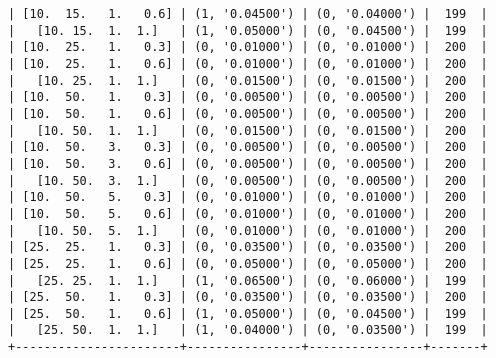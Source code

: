\documentclass{article}
\begin{document}
\begin{verbatim}
| [10.  15.   1.   0.6] | (1, '0.04500') | (0, '0.04000') |  199  |
|   [10. 15.  1.  1.]   | (1, '0.05000') | (0, '0.04500') |  199  |
| [10.  25.   1.   0.3] | (0, '0.01000') | (0, '0.01000') |  200  |
| [10.  25.   1.   0.6] | (0, '0.01000') | (0, '0.01000') |  200  |
|   [10. 25.  1.  1.]   | (0, '0.01500') | (0, '0.01500') |  200  |
| [10.  50.   1.   0.3] | (0, '0.00500') | (0, '0.00500') |  200  |
| [10.  50.   1.   0.6] | (0, '0.00500') | (0, '0.00500') |  200  |
|   [10. 50.  1.  1.]   | (0, '0.01500') | (0, '0.01500') |  200  |
| [10.  50.   3.   0.3] | (0, '0.00500') | (0, '0.00500') |  200  |
| [10.  50.   3.   0.6] | (0, '0.00500') | (0, '0.00500') |  200  |
|   [10. 50.  3.  1.]   | (0, '0.00500') | (0, '0.00500') |  200  |
| [10.  50.   5.   0.3] | (0, '0.01000') | (0, '0.01000') |  200  |
| [10.  50.   5.   0.6] | (0, '0.01000') | (0, '0.01000') |  200  |
|   [10. 50.  5.  1.]   | (0, '0.01000') | (0, '0.01000') |  200  |
| [25.  25.   1.   0.3] | (0, '0.03500') | (0, '0.03500') |  200  |
| [25.  25.   1.   0.6] | (0, '0.05000') | (0, '0.05000') |  200  |
|   [25. 25.  1.  1.]   | (1, '0.06500') | (0, '0.06000') |  199  |
| [25.  50.   1.   0.3] | (0, '0.03500') | (0, '0.03500') |  200  |
| [25.  50.   1.   0.6] | (1, '0.05000') | (0, '0.04500') |  199  |
|   [25. 50.  1.  1.]   | (1, '0.04000') | (0, '0.03500') |  199  |
+-----------------------+----------------+----------------+-------+
\end{verbatim}
\end{document}
